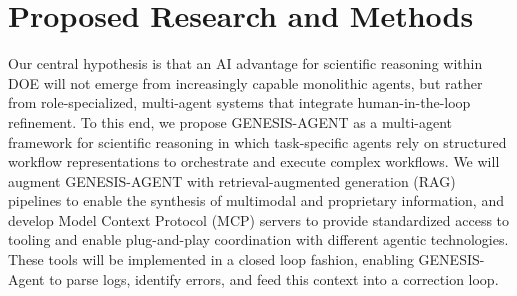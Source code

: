 \documentclass[11pt]{article} \usepackage[margin=1in]{geometry}
\begin{document}


\section{Proposed Research and Methods}
Our central hypothesis is that an AI advantage for scientific reasoning within DOE will not emerge from increasingly capable monolithic agents, but rather from role-specialized, multi-agent systems that integrate human-in-the-loop refinement.
To this end, we propose GENESIS-AGENT as a multi-agent framework for scientific reasoning in which task-specific agents rely on structured workflow representations to orchestrate and execute complex workflows. We will augment GENESIS-AGENT with retrieval-augmented generation (RAG)~\cite{lewis2021retrievalaugmentedgenerationknowledgeintensivenlp} pipelines to enable the synthesis of multimodal and proprietary information, and develop Model Context Protocol (MCP) servers to provide standardized access to tooling and enable plug-and-play coordination with different agentic technologies. 
These tools will be implemented in a closed loop fashion, enabling GENESIS-Agent to parse logs, identify errors, and feed this context into a correction loop. 
\end{document}
